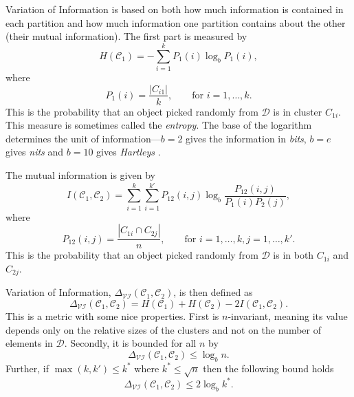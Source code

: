 \documentclass[a4paper]{report}
\newcommand{\dset}{\mathcal{D}}
\newcommand{\clus}{\mathcal{C}}
\newcommand{\partcompare}[1]{\Delta_{\mathcal{#1}}(\clus_1,\clus_2)}
\begin{document}
Variation of Information is based on both how much information is contained in
each partition and how much information one partition contains about the other
(their mutual information).  The first part is measured by
\begin{equation*}
  H(\clus_1) = -\sum_{i=1}^{k} P_1(i) \log_b P_1(i),
\end{equation*}
where
\begin{equation*}
  P_1(i) = \frac{|C_{i1}|}{k}, \qquad \text{for $i = 1,\dotsc,k$}.
\end{equation*}
This is the probability that an object picked randomly from $\dset$ is in
cluster $C_{1i}$.  This measure is sometimes called the \textit{entropy}.  The
base of the logarithm determines the unit of information---$b=2$ gives the
information in \textit{bits}, $b=e$ gives \textit{nits} and $b=10$ gives
\textit{Hartleys} \citep{kullback68information}.

The mutual information is given by
\begin{equation*}
  I(\clus_1,\clus_2) = \sum_{i=1}^{k} \sum_{i=1}^{k'}
                      P_{12}(i,j) \log_b \frac{P_{12}(i,j)}{P_1(i)P_2(j)},
\end{equation*}
where
\begin{equation*}
  P_{12}(i,j) = \frac{|C_{1i} \cap C_{2j}|}{n}, \qquad \text{for $i =
    1,\dotsc,k,j = 1,\dotsc,k'$}.
\end{equation*}
This is the probability that an object picked randomly from $\dset$ is in
both $C_{1i}$ and $C_{2j}$.

Variation of Information, $\partcompare{VI}$, is then defined as
\begin{equation*}
  \partcompare{VI} = H(\clus_1) + H(\clus_2) - 2I(\clus_1,\clus_2).
\end{equation*}
This is a metric with some nice properties.  First is $n$-invariant, meaning
its value depends only on the relative sizes of the clusters and not on the
number of elements in $\dset$.  Secondly, it is bounded for all $n$ by
\begin{equation*}
  \partcompare{VI} \leq \log_b n.
\end{equation*}
Further, if $\max(k,k') \leq k^*$ where $k^* \leq \sqrt{n}$ then the following
bound holds
\begin{equation*}
  \partcompare{VI} \leq 2 \log_b k^*.
\end{equation*}
\end{document}
